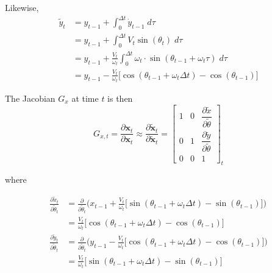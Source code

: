 \documentclass{article}
\begin{document}
\begin{enumerate}[label=(\roman*)]
Likewise,
\begin{equation}
\begin{aligned}
\tilde y_t &= y_{t-1} + \int_0^{\Delta t} \dot{y}_{t-1} \; d\tau \\
&= y_{t-1} + \int_0^{\Delta t} V_t \sin(\theta_t) \; d\tau \\
&= y_{t-1} + \frac{V_t}{\omega_t} \int_0^{\Delta t} \omega_t \cdot \sin(\theta_{t-1} + \omega_t\tau) \; d\tau \\
&= y_{t-1} - \frac{V_t}{\omega_t} \Big[ \cos(\theta_{t-1} + \omega_t\Delta t) - \cos(\theta_{t-1}) \Big]
\end{aligned}
\end{equation}

The Jacobian $G_x$ at time $t$ is then
\begin{equation}
G_{x,t}
= \frac{\partial \mathbf{x}_t}{\partial \mathbf{x}_t}
\approx \frac{\partial \tilde{\mathbf{x}}_t}{\partial \tilde{\mathbf{x}}_t}
= \begin{bmatrix}
1 & 0 & \dfrac{\partial \tilde x}{\partial \tilde \theta} \\[6pt]
0 & 1 & \dfrac{\partial \tilde y}{\partial \tilde \theta} \\[6pt]
0 & 0 & 1
\end{bmatrix}_t
\end{equation}

where

\begin{equation}
\begin{aligned}
\frac{\partial \tilde x_t}{\partial \tilde \theta_t}
&= \frac{\partial}{\partial \tilde \theta_t} \Bigg( x_{t-1} + \frac{V_t}{\omega_t} \Big[ \sin(\theta_{t-1} + \omega_t\Delta t) - \sin(\theta_{t-1}) \Big] \Bigg) \\
&= \frac{V_t}{\omega_t} \Big[ \cos(\theta_{t-1} + \omega_t \Delta t) - \cos(\theta_{t-1}) \Big] \\
\frac{\partial \tilde y_t}{\partial \tilde \theta_t}
&= \frac{\partial}{\partial \tilde \theta_t} \Bigg( y_{t-1} - \frac{V_t}{\omega_t} \Big[ \cos(\theta_{t-1} + \omega_t\Delta t) - \cos(\theta_{t-1}) \Big] \Bigg) \\
&= \frac{V_t}{\omega_t} \Big[ \sin(\theta_{t-1} + \omega_t \Delta t) - \sin(\theta_{t-1}) \Big]
\end{aligned}
\end{equation}


\end{enumerate}
\end{document}
